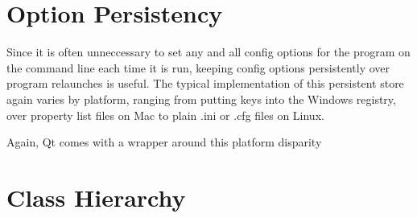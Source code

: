 \section{Option Persistency}
Since it is often unneccessary to set any and all config options for the program on the command line each time it is run, keeping config options persistently over program relaunches is useful. The typical implementation of this persistent store again varies by platform, ranging from putting keys into the Windows registry, over property list files on Mac to plain .ini or .cfg files on Linux.

Again, Qt comes with a wrapper around this platform disparity

\section{Class Hierarchy}
\begin{figure}[p]
\end{figure}
